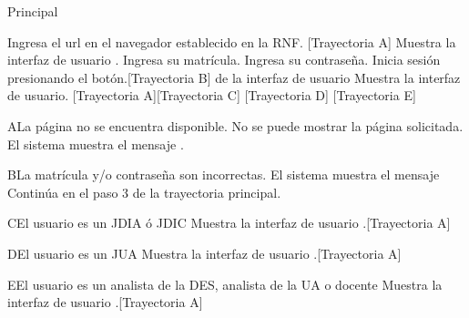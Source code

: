 \begin{UCtrayectoria}{Principal}
    
    \UCpaso[\UCactor] Ingresa el url en el navegador establecido en la RNF. [Trayectoria A] 
    \UCpaso Muestra la interfaz de usuario .
    \UCpaso[\UCactor] Ingresa su matrícula.
    \UCpaso[\UCactor] Ingresa su contraseña.
    \UCpaso[\UCactor] Inicia sesión presionando el botón.[Trayectoria B]
     de la interfaz de usuario 
    \UCpaso[\UCactor] Muestra la interfaz de usuario. [Trayectoria A][Trayectoria C] [Trayectoria D] [Trayectoria E]
\end{UCtrayectoria}


\begin{UCtrayectoriaA}{A}{La página no se encuentra disponible.}
	\UCpaso No se puede mostrar la página solicitada.
    \UCpaso El sistema muestra el mensaje .
\end{UCtrayectoriaA}


\begin{UCtrayectoriaA}{B}{La matrícula y/o contraseña son incorrectas.}
    \UCpaso El sistema muestra el mensaje 
    \UCpaso Continúa en el paso 3 de la trayectoria principal.
\end{UCtrayectoriaA}



\begin{UCtrayectoriaA}{C}{El usuario es un JDIA ó JDIC}
    \UCpaso Muestra la interfaz de usuario .[Trayectoria A]
\end{UCtrayectoriaA}


\begin{UCtrayectoriaA}{D}{El usuario es un JUA}
    \UCpaso Muestra la interfaz de usuario .[Trayectoria A]
\end{UCtrayectoriaA}


\begin{UCtrayectoriaA}{E}{El usuario es un analista de la DES, analista de la UA o docente}
    \UCpaso Muestra la interfaz de usuario .[Trayectoria A]
\end{UCtrayectoriaA}
